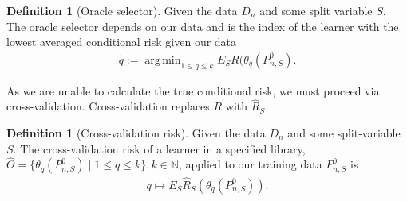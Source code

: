 \documentclass[11pt, a4paper]{article}
\DeclareMathOperator*{\argmin}{arg\,min}
\theoremstyle{definition}
\newtheorem{definition}[theorem]{Definition}
\theoremstyle{remark}
\newcommand{\q}{q}
\newcommand{\ml}{k}
\newcommand{\btheta}{\theta}
\begin{document}
\begin{definition}[Oracle selector]
    Given the data $ D_n $ and some split variable $ S $. The oracle selector depends on our data and is the index of the learner with the lowest averaged conditional risk given our data 
    \begin{align*}
        \tilde{\q} := \argmin_{1 \leq \q \leq \ml} E_S R( \btheta _\q (P_{n,S}^0 ) .
    \end{align*}
\end{definition}
As we are unable to calculate the true conditional risk, we must proceed via cross-validation. Cross-validation replaces $ R $ with $ \hat{R}_{S} $.
\begin{definition}[Cross-validation risk]
    Given the data $ D_n $ and some split-variable $ S $. The cross-validation risk of a learner in a specified library, $ \hat{\Theta} = \{ \btheta_{\q}(P_{n, S}^{0}) \mid 1 \leq \q \leq \ml \}, \ml \in \mathbb{N} $, applied to our training data $ P_{n, S}^{0} $ is  
    \begin{align*}
        \q \mapsto E_S \hat{R}_S( \btheta_\q(P_{n,S}^{0})).
    \end{align*}
\end{definition}
\end{document}
